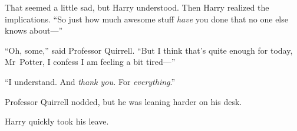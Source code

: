 That seemed a little sad, but Harry understood. Then Harry realized the implications. “So just how much awesome stuff \emph{have} you done that no one else knows about—”

“Oh, some,” said Professor Quirrell. “But I think that’s quite enough for today, Mr~Potter, I confess I am feeling a bit tired—”

“I understand. And \emph{thank you.} For \emph{everything}.”

Professor Quirrell nodded, but he was leaning harder on his desk.

Harry quickly took his leave.
